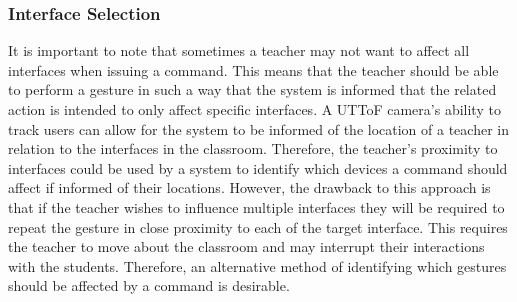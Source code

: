 \documentclass[manuscript, review, screen]{acmart}
\begin{document}
\subsubsection{Interface Selection}  
\label{sec:selection}

It is important to note that sometimes a teacher may not want to affect all interfaces when issuing a command.
This means that the teacher should be able to perform a gesture in such a way that the system is informed that the related action is intended to only affect specific interfaces.
A \ac{UTToF} camera's ability to track users can allow for the system to be informed of the location of a teacher in relation to the interfaces in the classroom.
Therefore, the teacher's proximity to interfaces could be used by a system to identify which devices a command should affect if informed of their locations.
However, the drawback to this approach is that if the teacher wishes to influence multiple interfaces they will be required to repeat the gesture in close proximity to each of the target interface.
This requires the teacher to move about the classroom and may interrupt their interactions with the students.
Therefore, an alternative method of identifying which gestures should be affected by a command is desirable.





\end{document}
